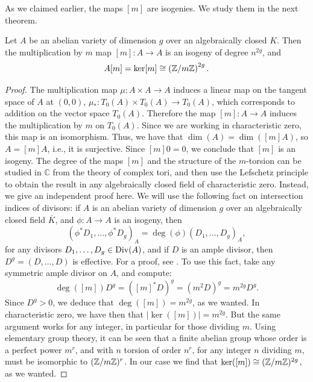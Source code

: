 As we claimed earlier, the maps $[m]$ are isogenies. We study them in the next theorem.
\begin{theorem}\label{isogenymult}
	Let $A$ be an abelian variety of dimension $g$ over an algebraically closed $K$. Then the multiplication by $m$ map $[m]:A\rightarrow A$ is an isogeny of degree $n^{2g}$, and
	\begin{equation*}
		A[m]=\ker[m]\cong\left(\mathbb{Z}/m\mathbb{Z}\right)^{2g}.
	\end{equation*}
\end{theorem}
\begin{proof}
	The multiplication map $\mu:A\times A\rightarrow A$ induces a linear map on the tangent space of $A$ at $(0,0)$, $\mu_*:T_0(A)\times T_0(A)\rightarrow T_0(A)$, which corresponds to addition on the vector space $T_0(A)$. Therefore the map $[m]:A\rightarrow A$ induces the multiplication by $m$ on $T_0(A)$. Since we are working in characteristic zero, this map is an isomorphism. Thus, we have that $\dim(A)=\dim([m]A)$, so $A=[m]A$, i.e., it is surjective. Since $[m]0=0$, we conclude that $[m]$ is an isogeny. The degree of the maps $[m]$ and the structure of the $m$-torsion can be studied in $\mathbb{C}$ from the theory of complex tori, and then use the Lefschetz principle to obtain the result in any algebraically closed field of characteristic zero. Instead, we give an independent proof here. We will use the following fact on intersection indices of divisors: if $A$ is an abelian variety of dimension $g$ over an algebraically closed field $\overline{K}$, and $\phi:A\rightarrow A$ is an isogeny, then
	\begin{equation*}
		(\phi^*D_1,\ldots,\phi^*D_g)_A=\deg(\phi)(D_1,\ldots,D_g)_A,
	\end{equation*}
	for any divisors $D_1,\ldots,D_g\in\operatorname{Div}(A)$, and if $D$ is an ample divisor, then $D^g=(D,\ldots,D)$ is effective. For a proof, see \cite{Hindry_Silverman_2000}.
	To use this fact, take any symmetric ample divisor on $A$, and compute:
	\begin{equation*}
		\deg([m])D^g=([m]^*D)^g=(m^2D)^g=m^{2g}D^g.
	\end{equation*}
	Since $D^g>0$, we deduce that $\deg([m])=m^{2g}$, as we wanted. In characteristic zero, we have then that $|\ker([m])|=m^{2g}$. But the same argument works for any integer, in particular for those dividing $m$. Using elementary group theory, it can be seen that a finite abelian group whose order is a perfect power $m^r$, and with $n$ torsion of order $n^r$, for any integer $n$ dividing $m$, must be isomorphic to $(\mathbb{Z}/m\mathbb{Z})^r$. In our case we find that $\ker([m])\cong(\mathbb{Z}/m\mathbb{Z})^{2g}$, as we wanted.
\end{proof}
